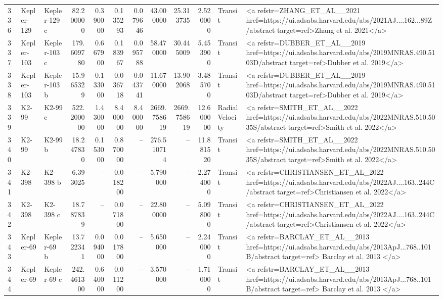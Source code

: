 \begin{tabular}{lllrrrrrrrll}
336 & Kepler-129 & Kepler-129 c & 82.200000 & 0.390000 & 0.135293 & 0.079646 & 43.000000 & 25.313735 & 2.520000 & Transit & <a refstr=ZHANG_ET_AL__2021 href=https://ui.adsabs.harvard.edu/abs/2021AJ....162...89Z/abstract target=ref>Zhang et al. 2021</a> \\
337 & Kepler-103 & Kepler-103 c & 179.609780 & 0.667900 & 0.183967 & 0.095788 & 58.470000 & 30.445009 & 5.453900 & Transit & <a refstr=DUBBER_ET_AL__2019 href=https://ui.adsabs.harvard.edu/abs/2019MNRAS.490.5103D/abstract target=ref>Dubber et al. 2019</a> \\
338 & Kepler-103 & Kepler-103 b & 15.965329 & 0.133000 & 0.036718 & 0.043741 & 11.670000 & 13.902068 & 3.485700 & Transit & <a refstr=DUBBER_ET_AL__2019 href=https://ui.adsabs.harvard.edu/abs/2019MNRAS.490.5103D/abstract target=ref>Dubber et al. 2019</a> \\
339 & K2-99 & K2-99 c & 522.200000 & 1.430000 & 8.400000 & 8.400000 & 2669.758619 & 2669.758619 & 12.600000 & Radial Velocity & <a refstr=SMITH_ET_AL__2022 href=https://ui.adsabs.harvard.edu/abs/2022MNRAS.510.5035S/abstract target=ref>Smith et al. 2022</a> \\
340 & K2-99 & K2-99 b & 18.247830 & 0.153000 & 0.870000 & -- & 276.510714 & -- & 11.881520 & Transit & <a refstr=SMITH_ET_AL__2022 href=https://ui.adsabs.harvard.edu/abs/2022MNRAS.510.5035S/abstract target=ref>Smith et al. 2022</a> \\
341 & K2-398 & K2-398 b & 6.393025 & -- & 0.018200 & -- & 5.790000 & -- & 2.274000 & Transit & <a refstr=CHRISTIANSEN_ET_AL_2022 href=https://ui.adsabs.harvard.edu/abs/2022AJ....163..244C/abstract target=ref>Christiansen et al. 2022</a> \\
342 & K2-398 & K2-398 c & 18.787839 & -- & 0.071800 & -- & 22.800000 & -- & 5.098000 & Transit & <a refstr=CHRISTIANSEN_ET_AL_2022 href=https://ui.adsabs.harvard.edu/abs/2022AJ....163..244C/abstract target=ref>Christiansen et al. 2022</a> \\
343 & Kepler-69 & Kepler-69 b & 13.722341 & 0.094000 & 0.017800 & -- & 5.650000 & -- & 2.240000 & Transit & <a refstr=BARCLAY_ET_AL__2013 href=https://ui.adsabs.harvard.edu/abs/2013ApJ...768..101B/abstract target=ref> Barclay et al. 2013 </a> \\
344 & Kepler-69 & Kepler-69 c & 242.461300 & 0.640000 & 0.011200 & -- & 3.570000 & -- & 1.710000 & Transit & <a refstr=BARCLAY_ET_AL__2013 href=https://ui.adsabs.harvard.edu/abs/2013ApJ...768..101B/abstract target=ref> Barclay et al. 2013 </a> \\

\end{tabular}
